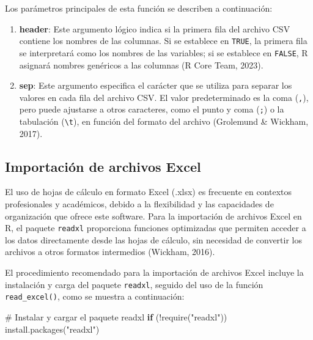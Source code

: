 \documentclass[
  spanish,
  a4paper,
  DIV=11,
  numbers=noendperiod,
  onepage,
  openany]{scrreprt}
\newenvironment{Shaded}{\begin{snugshade}}{\end{snugshade}}
\newcommand{\CommentTok}[1]{\textcolor[rgb]{0.37,0.37,0.37}{#1}}
\newcommand{\ControlFlowTok}[1]{\textcolor[rgb]{0.00,0.23,0.31}{\textbf{#1}}}
\newcommand{\FunctionTok}[1]{\textcolor[rgb]{0.28,0.35,0.67}{#1}}
\newcommand{\NormalTok}[1]{\textcolor[rgb]{0.00,0.23,0.31}{#1}}
\newcommand{\SpecialCharTok}[1]{\textcolor[rgb]{0.37,0.37,0.37}{#1}}
\newcommand{\StringTok}[1]{\textcolor[rgb]{0.13,0.47,0.30}{#1}}
\begin{document}
Los parámetros principales de esta función se describen a continuación:

\begin{enumerate}
\def\labelenumi{\arabic{enumi}.}
\item
  \textbf{header}: Este argumento lógico indica si la primera fila del
  archivo CSV contiene los nombres de las columnas. Si se establece en
  \texttt{TRUE}, la primera fila se interpretará como los nombres de las
  variables; si se establece en \texttt{FALSE}, R asignará nombres
  genéricos a las columnas (R Core Team, 2023).
\item
  \textbf{sep}: Este argumento especifica el carácter que se utiliza
  para separar los valores en cada fila del archivo CSV. El valor
  predeterminado es la coma (\texttt{,}), pero puede ajustarse a otros
  caracteres, como el punto y coma (\texttt{;}) o la tabulación
  (\texttt{\textbackslash{}t}), en función del formato del archivo
  (Grolemund \& Wickham, 2017).
\end{enumerate}

\subsection{Importación de archivos
Excel}\label{importaciuxf3n-de-archivos-excel}

El uso de hojas de cálculo en formato Excel (.xlsx) es frecuente en
contextos profesionales y académicos, debido a la flexibilidad y las
capacidades de organización que ofrece este software. Para la
importación de archivos Excel en R, el paquete \texttt{readxl}
proporciona funciones optimizadas que permiten acceder a los datos
directamente desde las hojas de cálculo, sin necesidad de convertir los
archivos a otros formatos intermedios (Wickham, 2016).

El procedimiento recomendado para la importación de archivos Excel
incluye la instalación y carga del paquete \texttt{readxl}, seguido del
uso de la función \texttt{read\_excel()}, como se muestra a
continuación:

\begin{Shaded}
\begin{Highlighting}[]
\CommentTok{\# Instalar y cargar el paquete readxl}
\ControlFlowTok{if}\NormalTok{ (}\SpecialCharTok{!}\FunctionTok{require}\NormalTok{(}\StringTok{"readxl"}\NormalTok{)) }\FunctionTok{install.packages}\NormalTok{(}\StringTok{"readxl"}\NormalTok{)}
\end{Highlighting}
\end{Shaded}
\end{document}
